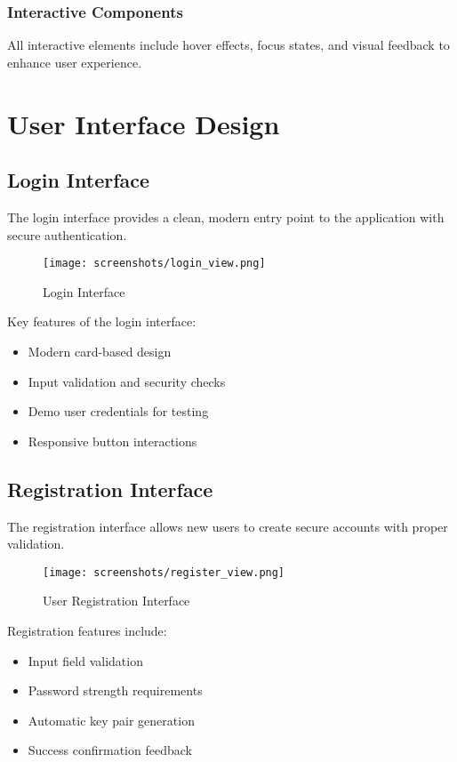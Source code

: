 \documentclass[12pt,a4paper]{article}
\begin{document}
\subsubsection{Interactive Components}
All interactive elements include hover effects, focus states, and visual feedback to enhance user experience.

\section{User Interface Design}

\subsection{Login Interface}
The login interface provides a clean, modern entry point to the application with secure authentication.

\begin{figure}[H]
    \centering
    \texttt{[image: screenshots/login\_view.png]}
    \caption{Login Interface}
    \label{fig:login}
\end{figure}

Key features of the login interface:
\begin{itemize}
    \item Modern card-based design
    \item Input validation and security checks
    \item Demo user credentials for testing
    \item Responsive button interactions
\end{itemize}

\subsection{Registration Interface}
The registration interface allows new users to create secure accounts with proper validation.

\begin{figure}[H]
    \centering
    \texttt{[image: screenshots/register\_view.png]}
    \caption{User Registration Interface}
    \label{fig:register}
\end{figure}

Registration features include:
\begin{itemize}
    \item Input field validation
    \item Password strength requirements
    \item Automatic key pair generation
    \item Success confirmation feedback
\end{itemize}
\end{document}
